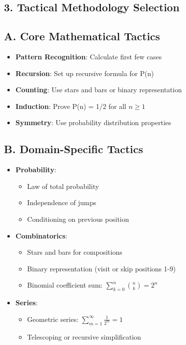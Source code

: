 \documentclass[11pt]{article}
\begin{document}
\begin{tacticalbox}
\section*{3. Tactical Methodology Selection}

\subsection*{A. Core Mathematical Tactics}
\begin{itemize}[leftmargin=*]
    \item \textbf{Pattern Recognition}: Calculate first few cases
    \item \textbf{Recursion}: Set up recursive formula for P(n)
    \item \textbf{Counting}: Use stars and bars or binary representation
    \item \textbf{Induction}: Prove P(n) = 1/2 for all $n \geq 1$
    \item \textbf{Symmetry}: Use probability distribution properties
\end{itemize}

\subsection*{B. Domain-Specific Tactics}
\begin{itemize}[leftmargin=*]
    \item \textbf{Probability}:
    \begin{itemize}
        \item Law of total probability
        \item Independence of jumps
        \item Conditioning on previous position
    \end{itemize}
    \item \textbf{Combinatorics}:
    \begin{itemize}
        \item Stars and bars for compositions
        \item Binary representation (visit or skip positions 1-9)
        \item Binomial coefficient sum: $\sum_{k=0}^{n} \binom{n}{k} = 2^n$
    \end{itemize}
    \item \textbf{Series}:
    \begin{itemize}
        \item Geometric series: $\sum_{m=1}^{\infty} \frac{1}{2^m} = 1$
        \item Telescoping or recursive simplification
    \end{itemize}
\end{itemize}


\end{tacticalbox}
\end{document}
